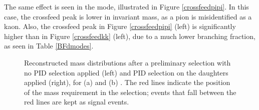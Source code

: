 The same effect is seen in the \pipi mode, illustrated in Figure \ref{crossfeedpipi}. In this case, the crossfeed peak is lower in invariant mass, as a pion is misidentified as a kaon. Also, the crossfeed peak in Figure \ref{crossfeedpipi} (left) is significantly higher than in Figure \ref{crossfeedkk} (left), due to a much lower \decay{\Dz}{\pip\pim} branching fraction, as seen in Table \ref{BFdmodes}.

\begin{figure}
\hfill
{}
\caption{Reconstructed \Dz mass distributions after a preliminary selection with no PID selection applied (left) and PID selection on the \Dz daughters applied (right), for (a) \kk and (b) \pipi. The red lines indicate the position of the \Dz mass requirement in the selection; events that fall between the red lines are kept as signal events.}
\label{fig:crossfeed}
\end{figure}

